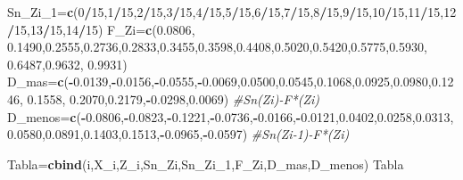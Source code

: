 \documentclass[
  a4paper,
  oneside,
  openany]{book}
\newenvironment{Shaded}{\begin{snugshade}}{\end{snugshade}}
\newcommand{\CommentTok}[1]{\textcolor[rgb]{0.56,0.35,0.01}{\textit{#1}}}
\newcommand{\DecValTok}[1]{\textcolor[rgb]{0.00,0.00,0.81}{#1}}
\newcommand{\FloatTok}[1]{\textcolor[rgb]{0.00,0.00,0.81}{#1}}
\newcommand{\FunctionTok}[1]{\textcolor[rgb]{0.13,0.29,0.53}{\textbf{#1}}}
\newcommand{\NormalTok}[1]{#1}
\newcommand{\OtherTok}[1]{\textcolor[rgb]{0.56,0.35,0.01}{#1}}
\newcommand{\SpecialCharTok}[1]{\textcolor[rgb]{0.81,0.36,0.00}{\textbf{#1}}}
\begin{document}
\begin{Shaded}
\begin{Highlighting}[]
\NormalTok{Sn\_Zi\_1}\OtherTok{=}\FunctionTok{c}\NormalTok{(}\DecValTok{0}\SpecialCharTok{/}\DecValTok{15}\NormalTok{,}\DecValTok{1}\SpecialCharTok{/}\DecValTok{15}\NormalTok{,}\DecValTok{2}\SpecialCharTok{/}\DecValTok{15}\NormalTok{,}\DecValTok{3}\SpecialCharTok{/}\DecValTok{15}\NormalTok{,}\DecValTok{4}\SpecialCharTok{/}\DecValTok{15}\NormalTok{,}\DecValTok{5}\SpecialCharTok{/}\DecValTok{15}\NormalTok{,}\DecValTok{6}\SpecialCharTok{/}\DecValTok{15}\NormalTok{,}\DecValTok{7}\SpecialCharTok{/}\DecValTok{15}\NormalTok{,}\DecValTok{8}\SpecialCharTok{/}\DecValTok{15}\NormalTok{,}\DecValTok{9}\SpecialCharTok{/}\DecValTok{15}\NormalTok{,}\DecValTok{10}\SpecialCharTok{/}\DecValTok{15}\NormalTok{,}\DecValTok{11}\SpecialCharTok{/}\DecValTok{15}\NormalTok{,}\DecValTok{12}\SpecialCharTok{/}\DecValTok{15}\NormalTok{,}\DecValTok{13}\SpecialCharTok{/}\DecValTok{15}\NormalTok{,}\DecValTok{14}\SpecialCharTok{/}\DecValTok{15}\NormalTok{)}
\NormalTok{F\_Zi}\OtherTok{=}\FunctionTok{c}\NormalTok{(}\FloatTok{0.0806}\NormalTok{, }\FloatTok{0.1490}\NormalTok{,}\FloatTok{0.2555}\NormalTok{,}\FloatTok{0.2736}\NormalTok{,}\FloatTok{0.2833}\NormalTok{,}\FloatTok{0.3455}\NormalTok{,}\FloatTok{0.3598}\NormalTok{,}\FloatTok{0.4408}\NormalTok{,}\FloatTok{0.5020}\NormalTok{,}\FloatTok{0.5420}\NormalTok{,}\FloatTok{0.5775}\NormalTok{,}\FloatTok{0.5930}\NormalTok{,}
       \FloatTok{0.6487}\NormalTok{,}\FloatTok{0.9632}\NormalTok{, }\FloatTok{0.9931}\NormalTok{)}
\NormalTok{D\_mas}\OtherTok{=}\FunctionTok{c}\NormalTok{(}\SpecialCharTok{{-}}\FloatTok{0.0139}\NormalTok{,}\SpecialCharTok{{-}}\FloatTok{0.0156}\NormalTok{,}\SpecialCharTok{{-}}\FloatTok{0.0555}\NormalTok{,}\SpecialCharTok{{-}}\FloatTok{0.0069}\NormalTok{,}\FloatTok{0.0500}\NormalTok{,}\FloatTok{0.0545}\NormalTok{,}\FloatTok{0.1068}\NormalTok{,}\FloatTok{0.0925}\NormalTok{,}\FloatTok{0.0980}\NormalTok{,}\FloatTok{0.1246}\NormalTok{, }\FloatTok{0.1558}\NormalTok{,}
        \FloatTok{0.2070}\NormalTok{,}\FloatTok{0.2179}\NormalTok{,}\SpecialCharTok{{-}}\FloatTok{0.0298}\NormalTok{,}\FloatTok{0.0069}\NormalTok{)    }\CommentTok{\#Sn(Zi){-}F*(Zi)}
\NormalTok{D\_menos}\OtherTok{=}\FunctionTok{c}\NormalTok{(}\SpecialCharTok{{-}}\FloatTok{0.0806}\NormalTok{,}\SpecialCharTok{{-}}\FloatTok{0.0823}\NormalTok{,}\SpecialCharTok{{-}}\FloatTok{0.1221}\NormalTok{,}\SpecialCharTok{{-}}\FloatTok{0.0736}\NormalTok{,}\SpecialCharTok{{-}}\FloatTok{0.0166}\NormalTok{,}\SpecialCharTok{{-}}\FloatTok{0.0121}\NormalTok{,}\FloatTok{0.0402}\NormalTok{,}\FloatTok{0.0258}\NormalTok{,}\FloatTok{0.0313}\NormalTok{, }
          \FloatTok{0.0580}\NormalTok{,}\FloatTok{0.0891}\NormalTok{,}\FloatTok{0.1403}\NormalTok{,}\FloatTok{0.1513}\NormalTok{,}\SpecialCharTok{{-}}\FloatTok{0.0965}\NormalTok{,}\SpecialCharTok{{-}}\FloatTok{0.0597}\NormalTok{)   }\CommentTok{\#Sn(Zi{-}1){-}F*(Zi)}

\NormalTok{Tabla}\OtherTok{=}\FunctionTok{cbind}\NormalTok{(i,X\_i,Z\_i,Sn\_Zi,Sn\_Zi\_1,F\_Zi,D\_mas,D\_menos)}
\NormalTok{Tabla}
\end{Highlighting}
\end{Shaded}
\end{document}
